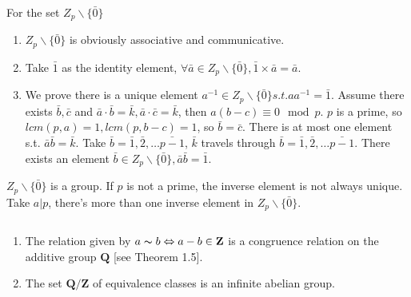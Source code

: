 \begin{answer}
    For the set $Z_p\backslash\{\bar{0}\}$
    \begin{enumerate}
        \item $Z_p\backslash\{\bar{0}\}$ is obviously associative and communicative.
        \item Take $\bar{1}$ as the identity element, $\forall \bar{a}\in Z_p\backslash\{\bar{0}\}, \bar{1}\times \bar{a}=\bar{a}$.
        \item We prove there is a unique element $a^{-1}\in Z_p\backslash\{\bar{0}\} s.t. aa^{-1}=\bar{1} $. Assume there exists $\bar{b},\bar{c}$ and $\bar{a}\cdot\bar{b}=\bar{k},\bar{a}\cdot\bar{c}=\bar{k}$, then $a(b-c)\equiv 0\mod{p}$. $p$ is a prime, so $lcm(p,a)=1,  lcm(p,b-c)=1$, so $\bar{b}=\bar{c}$. There is at most one element s.t. $\bar{a}\bar{b}=\bar{k}$. Take $\bar{b}=\bar{1}, \bar{2},\dots\bar{p-1}$, $\bar{k}$ travels through $\bar{b}=\bar{1}, \bar{2},\dots\bar{p-1}$. There exists an element $\bar{b}\in Z_p\backslash\{\bar{0}\}, \bar{a}\bar{b}=\bar{1}$.
    \end{enumerate}
    $Z_p\backslash\{\bar{0}\}$ is a group. If $p$ is not a prime, the inverse element is not always unique. Take $a|p$, there's more than one inverse element in $Z_p\backslash\{\bar{0}\}$.
\end{answer}

$$ $$

\begin{ex}
    \begin{enumerate}
        \item The relation given by $a \thicksim b \Leftrightarrow a - b \in \mathbf{Z}$ is a congruence relation on the additive group $\mathbf{Q}$ [see Theorem 1.5].
        \item The set $\mathbf{Q}/\mathbf{Z}$ of equivalence classes is an infinite abelian group.
    \end{enumerate}
\end{ex}

